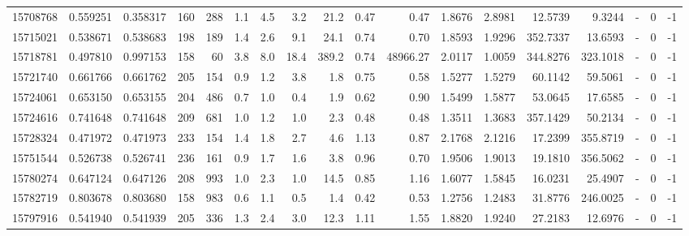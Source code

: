 \begin{tabular}{rrrrrrrrrrrrrrrlrr}
  15708768 & 0.559251 &   0.358317 &  160 &  288 &      1.1 &      4.5 &     3.2 &     21.2 &       0.47 &        0.47 &  1.8676 &  2.8981 &   12.5739 &    9.3244 &             - &        0 &         -1 \\
  15715021 & 0.538671 &   0.538683 &  198 &  189 &      1.4 &      2.6 &     9.1 &     24.1 &       0.74 &        0.70 &  1.8593 &  1.9296 &  352.7337 &   13.6593 &             - &        0 &         -1 \\
  15718781 & 0.497810 &   0.997153 &  158 &   60 &      3.8 &      8.0 &    18.4 &    389.2 &       0.74 &    48966.27 &  2.0117 &  1.0059 &  344.8276 &  323.1018 &             - &        0 &         -1 \\
  15721740 & 0.661766 &   0.661762 &  205 &  154 &      0.9 &      1.2 &     3.8 &      1.8 &       0.75 &        0.58 &  1.5277 &  1.5279 &   60.1142 &   59.5061 &             - &        0 &         -1 \\
  15724061 & 0.653150 &   0.653155 &  204 &  486 &      0.7 &      1.0 &     0.4 &      1.9 &       0.62 &        0.90 &  1.5499 &  1.5877 &   53.0645 &   17.6585 &             - &        0 &         -1 \\
  15724616 & 0.741648 &   0.741648 &  209 &  681 &      1.0 &      1.2 &     1.0 &      2.3 &       0.48 &        0.48 &  1.3511 &  1.3683 &  357.1429 &   50.2134 &             - &        0 &         -1 \\
  15728324 & 0.471972 &   0.471973 &  233 &  154 &      1.4 &      1.8 &     2.7 &      4.6 &       1.13 &        0.87 &  2.1768 &  2.1216 &   17.2399 &  355.8719 &             - &        0 &         -1 \\
  15751544 & 0.526738 &   0.526741 &  236 &  161 &      0.9 &      1.7 &     1.6 &      3.8 &       0.96 &        0.70 &  1.9506 &  1.9013 &   19.1810 &  356.5062 &             - &        0 &         -1 \\
  15780274 & 0.647124 &   0.647126 &  208 &  993 &      1.0 &      2.3 &     1.0 &     14.5 &       0.85 &        1.16 &  1.6077 &  1.5845 &   16.0231 &   25.4907 &             - &        0 &         -1 \\
  15782719 & 0.803678 &   0.803680 &  158 &  983 &      0.6 &      1.1 &     0.5 &      1.4 &       0.42 &        0.53 &  1.2756 &  1.2483 &   31.8776 &  246.0025 &             - &        0 &         -1 \\
  15797916 & 0.541940 &   0.541939 &  205 &  336 &      1.3 &      2.4 &     3.0 &     12.3 &       1.11 &        1.55 &  1.8820 &  1.9240 &   27.2183 &   12.6976 &             - &        0 &         -1 \\

\end{tabular}
